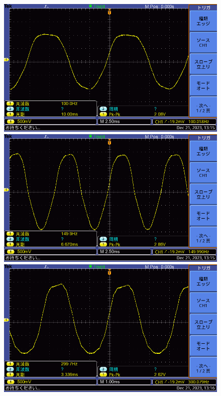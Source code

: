 \documentclass{ltjsarticle}
\begin{document}
			\begin{figure}[H]
			\centering
			\begin{minipage}{0.4\columnwidth}
			\centering
			\includegraphics[width = \columnwidth]{figs/F0026TEK.PNG}
			\end{minipage}
			\hspace{0.04\columnwidth}
			\begin{minipage}{0.4\columnwidth}
			\centering
			\includegraphics[width = \columnwidth]{figs/F0027TEK.PNG}
			\end{minipage}
			\hspace{0.04\columnwidth}
			\begin{minipage}{0.4\columnwidth}
			\centering
			\includegraphics[width = \columnwidth]{figs/F0028TEK.PNG}

\end{minipage}
\end{figure}
\end{document}
